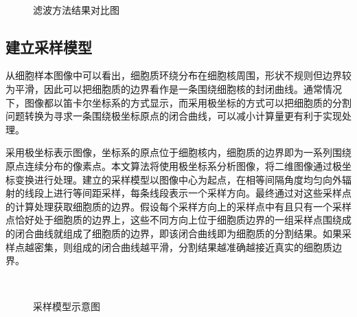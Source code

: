 \documentclass[nomlist,masters]{seuthesix}
\begin{document}
\begin{figure}[H]
\centering 
\hspace{0.01\textwidth}
\hspace{0.01\textwidth}
\vfill
\centering 
\hspace{0.01\textwidth}
\caption{滤波方法结果对比图}
\label{filterret}
\end{figure}


\subsection{建立采样模型}
从细胞样本图像中可以看出，细胞质环绕分布在细胞核周围，形状不规则但边界较为平滑，因此可以把细胞质的边界看作是一条围绕细胞核的封闭曲线。通常情况下，图像都以笛卡尔坐标系的方式显示，而采用极坐标\cite{Xu2013Cell}的方式可以把细胞质的分割问题转换为寻求一条围绕极坐标原点的闭合曲线，可以减小计算量更有利于实现处理。


采用极坐标表示图像，坐标系的原点位于细胞核内，细胞质的边界即为一系列围绕原点连续分布的像素点。本文算法将使用极坐标系分析图像，将二维图像通过极坐标变换进行处理。建立的采样模型以图像中心为起点，在相等间隔角度均匀向外辐射的线段上进行等间距采样，每条线段表示一个采样方向。最终通过对这些采样点的计算处理获取细胞质的边界。假设每个采样方向上的采样点中有且只有一个采样点恰好处于细胞质的边界上，这些不同方向上位于细胞质边界的一组采样点围绕成的闭合曲线就组成了细胞质的边界，即该闭合曲线即为细胞质的分割结果。如果采样点越密集，则组成的闭合曲线越平滑，分割结果越准确越接近真实的细胞质边界。

\begin{figure}[H]
\centering 
\hspace{0.001\textwidth}
\centering 
\caption{采样模型示意图}
\label{Samppoint}
\end{figure}
\end{document}
